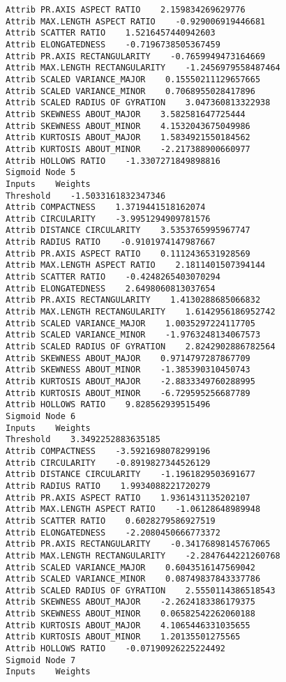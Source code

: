 \documentclass[
	article,			%
	11pt,				%
	oneside,			%
	a4paper,			%
	english,			%
	brazil,				%
	sumario=tradicional
	]{abntex2}
\begin{document}
\begin{lstlisting}
Attrib PR.AXIS ASPECT RATIO    2.159834269629776
Attrib MAX.LENGTH ASPECT RATIO    -0.929006919446681
Attrib SCATTER RATIO    1.5216457440942603
Attrib ELONGATEDNESS    -0.7196738505367459
Attrib PR.AXIS RECTANGULARITY    -0.7659949473164669
Attrib MAX.LENGTH RECTANGULARITY    -1.2456979558487464
Attrib SCALED VARIANCE_MAJOR    0.15550211129657665
Attrib SCALED VARIANCE_MINOR    0.7068955028417896
Attrib SCALED RADIUS OF GYRATION    3.047360813322938
Attrib SKEWNESS ABOUT_MAJOR    3.582581647725444
Attrib SKEWNESS ABOUT_MINOR    4.1532043675049986
Attrib KURTOSIS ABOUT_MAJOR    1.5834921550184562
Attrib KURTOSIS ABOUT_MINOR    -2.217388900660977
Attrib HOLLOWS RATIO    -1.3307271849898816
Sigmoid Node 5
Inputs    Weights
Threshold    -1.5033161832347346
Attrib COMPACTNESS    1.3719441518162074
Attrib CIRCULARITY    -3.9951294909781576
Attrib DISTANCE CIRCULARITY    3.5353765995967747
Attrib RADIUS RATIO    -0.9101974147987667
Attrib PR.AXIS ASPECT RATIO    0.1112436531928569
Attrib MAX.LENGTH ASPECT RATIO    2.1811401507394144
Attrib SCATTER RATIO    -0.4248265403070294
Attrib ELONGATEDNESS    2.6498060813037654
Attrib PR.AXIS RECTANGULARITY    1.4130288685066832
Attrib MAX.LENGTH RECTANGULARITY    1.6142956186952742
Attrib SCALED VARIANCE_MAJOR    1.0035297224117705
Attrib SCALED VARIANCE_MINOR    -1.9763248134067573
Attrib SCALED RADIUS OF GYRATION    2.8242902886782564
Attrib SKEWNESS ABOUT_MAJOR    0.9714797287867709
Attrib SKEWNESS ABOUT_MINOR    -1.385390310450743
Attrib KURTOSIS ABOUT_MAJOR    -2.8833349760288995
Attrib KURTOSIS ABOUT_MINOR    -6.729595256687789
Attrib HOLLOWS RATIO    9.828562939515496
Sigmoid Node 6
Inputs    Weights
Threshold    3.3492252883635185
Attrib COMPACTNESS    -3.5921698078299196
Attrib CIRCULARITY    -0.8919827344526129
Attrib DISTANCE CIRCULARITY    -1.1961829503691677
Attrib RADIUS RATIO    1.9934088221720279
Attrib PR.AXIS ASPECT RATIO    1.9361431135202107
Attrib MAX.LENGTH ASPECT RATIO    -1.06128648989948
Attrib SCATTER RATIO    0.6028279586927519
Attrib ELONGATEDNESS    -2.2080450666773372
Attrib PR.AXIS RECTANGULARITY    -0.34176898145767065
Attrib MAX.LENGTH RECTANGULARITY    -2.2847644221260768
Attrib SCALED VARIANCE_MAJOR    0.6043516147569042
Attrib SCALED VARIANCE_MINOR    0.08749837843337786
Attrib SCALED RADIUS OF GYRATION    2.5550114386518543
Attrib SKEWNESS ABOUT_MAJOR    -2.2624183386179375
Attrib SKEWNESS ABOUT_MINOR    0.06582542262060188
Attrib KURTOSIS ABOUT_MAJOR    4.1065446331035655
Attrib KURTOSIS ABOUT_MINOR    1.20135501275565
Attrib HOLLOWS RATIO    -0.07190926225224492
Sigmoid Node 7
Inputs    Weights

\end{lstlisting}
\end{document}
